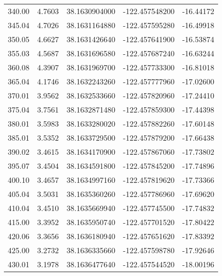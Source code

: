 \begin{scriptsize}
\begin{longtable}{p{2.5cm}p{2.5cm}p{3cm}p{3cm}p{2.5cm}}
           340.00  & 	 4.7603 &               38.1630904000  &   -122.457548200   &	-16.44172 \\
           345.04  & 	 4.7026 &               38.1631164880  &   -122.457595280   &	-16.49918 \\
           350.05  & 	 4.6627 &               38.1631426640  &   -122.457641900   &	-16.53874 \\
           355.03  & 	 4.5687 &               38.1631696580  &   -122.457687240   &	-16.63244 \\
           360.08  & 	 4.3907 &               38.1631969700  &   -122.457733300   &	-16.81018 \\
           365.04  & 	 4.1746 &               38.1632243260  &   -122.457777960   &	-17.02600 \\
           370.01  & 	 3.9562 &               38.1632533660  &   -122.457820960   &	-17.24410 \\
           375.04  & 	 3.7561 &               38.1632871480  &   -122.457859300   &	-17.44398 \\
           380.01  & 	 3.5983 &               38.1633280020  &   -122.457882260   &	-17.60148 \\
           385.01  & 	 3.5352 &               38.1633729500  &   -122.457879200   &	-17.66438 \\
           390.02  & 	 3.4615 &               38.1634170900  &   -122.457867060   &	-17.73802 \\
           395.07  & 	 3.4504 &               38.1634591800  &   -122.457845200   &	-17.74896 \\
           400.10  & 	 3.4657 &               38.1634997160  &   -122.457819620   &	-17.73366 \\
           405.04  & 	 3.5031 &               38.1635360260  &   -122.457786960   &	-17.69620 \\
           410.04  & 	 3.4510 &               38.1635669940  &   -122.457745500   &	-17.74832 \\
           415.00  & 	 3.3952 &               38.1635950740  &   -122.457701520   &	-17.80422 \\
           420.06  & 	 3.3656 &               38.1636180940  &   -122.457651620   &	-17.83392 \\
           425.00  & 	 3.2732 &               38.1636335660  &   -122.457598780   &	-17.92646 \\
           430.01  & 	 3.1978 &               38.1636477640  &   -122.457544520   &	-18.00196 \\

\end{longtable}
\end{scriptsize}
